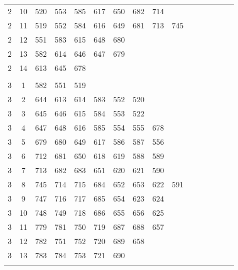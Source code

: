 {{\begin{table}[htbp]
\begin{center}
\begin{tabular}{cccccccccccccccc}
      2 & 10 & 520 & 553 & 585 & 617 & 650 & 682 & 714 \\
      2 & 11 & 519 & 552 & 584 & 616 & 649 & 681 & 713 & 745 \\
      2 & 12 & 551 & 583 & 615 & 648 & 680 \\
      2 & 13 & 582 & 614 & 646 & 647 & 679 \\
      2 & 14 & 613 & 645 & 678 \\
      && \\
      3 &  1 & 582 & 551 & 519 \\
      3 &  2 & 644 & 613 & 614 & 583 & 552 & 520 \\
      3 &  3 & 645 & 646 & 615 & 584 & 553 & 522 \\
      3 &  4 & 647 & 648 & 616 & 585 & 554 & 555 & 678 \\
      3 &  5 & 679 & 680 & 649 & 617 & 586 & 587 & 556 \\
      3 &  6 & 712 & 681 & 650 & 618 & 619 & 588 & 589 \\
      3 &  7 & 713 & 682 & 683 & 651 & 620 & 621 & 590 \\
      3 &  8 & 745 & 714 & 715 & 684 & 652 & 653 & 622 & 591 \\
      3 &  9 & 747 & 716 & 717 & 685 & 654 & 623 & 624 \\
      3 & 10 & 748 & 749 & 718 & 686 & 655 & 656 & 625 \\
      3 & 11 & 779 & 781 & 750 & 719 & 687 & 688 & 657 \\
      3 & 12 & 782 & 751 & 752 & 720 & 689 & 658 \\
      3 & 13 & 783 & 784 & 753 & 721 & 690 \\
      && \\
    \end{tabular}
  \end{center}
\label{tab:tres rows}
\end{table} }}
 
